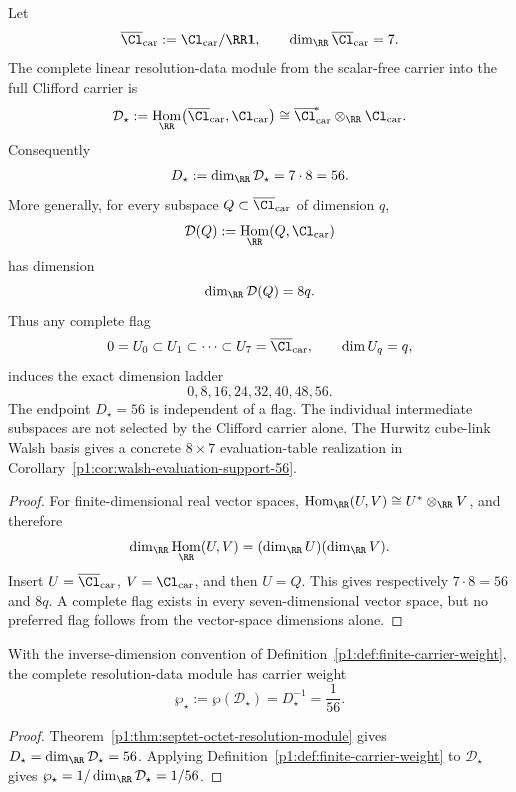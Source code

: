 \documentclass[11pt]{article}
\DeclareMathOperator{\Hom}{Hom}
\begin{document}
\begin{theorem}
\label{p1:thm:septet-octet-resolution-module}
Let
\[
    \overline{\Cl}_{\mathrm{car}}
    :=\Cl_{\mathrm{car}}/\RR\mathbf1,
    \qquad
    \dim_\RR\overline{\Cl}_{\mathrm{car}}=7.
\]
The complete linear resolution-data module from the scalar-free carrier into the
full Clifford carrier is
\[
    \mathcal D_\star
    :=\Hom_\RR\!\left(\overline{\Cl}_{\mathrm{car}},
                       \Cl_{\mathrm{car}}\right)
    \cong
    \overline{\Cl}_{\mathrm{car}}^{\!*}\otimes_\RR
    \Cl_{\mathrm{car}}.
\]
Consequently
\[
    D_\star:=\dim_\RR\mathcal D_\star=7\cdot8=56.
\]
More generally, for every subspace
\(Q\subset\overline{\Cl}_{\mathrm{car}}\) of dimension \(q\),
\[
    \mathcal D(Q):=\Hom_\RR(Q,\Cl_{\mathrm{car}})
\]
has dimension
\[
    \dim_\RR\mathcal D(Q)=8q.
\]
Thus any complete flag
\[
    0=U_0\subset U_1\subset\cdots\subset U_7
      =\overline{\Cl}_{\mathrm{car}},
    \qquad \dim U_q=q,
\]
induces the exact dimension ladder
\[
    0,8,16,24,32,40,48,56.
\]
The endpoint \(D_\star=56\) is independent of a flag.  The individual
intermediate subspaces are not selected by the Clifford carrier alone.  The
Hurwitz cube-link Walsh basis gives a concrete \(8\times7\) evaluation-table
realization in Corollary~\ref{p1:cor:walsh-evaluation-support-56}.
\end{theorem}

\begin{proof}
For finite-dimensional real vector spaces,
\(\Hom_\RR(U,V)\cong U^*\otimes_\RR V\), and therefore
\[
    \dim_\RR\Hom_\RR(U,V)
    =(\dim_\RR U)(\dim_\RR V).
\]
Insert \(U=\overline{\Cl}_{\mathrm{car}}\), \(V=\Cl_{\mathrm{car}}\),
and then \(U=Q\).  This gives respectively \(7\cdot8=56\) and \(8q\).
A complete flag exists in every seven-dimensional vector space, but no preferred
flag follows from the vector-space dimensions alone.
\end{proof}

\begin{corollary}
\label{p1:cor:carrier-q0}
With the inverse-dimension convention of
Definition~\ref{p1:def:finite-carrier-weight}, the complete resolution-data
module has carrier weight
\[
    \wp_\star:=\wp(\mathcal D_\star)=D_\star^{-1}=\frac1{56}.
\]
\end{corollary}

\begin{proof}
Theorem~\ref{p1:thm:septet-octet-resolution-module} gives
\(D_\star=\dim_\RR\mathcal D_\star=56\).  Applying
Definition~\ref{p1:def:finite-carrier-weight} to \(\mathcal D_\star\) gives
\(\wp_\star=1/\dim_\RR\mathcal D_\star=1/56\).
\end{proof}
\end{document}
